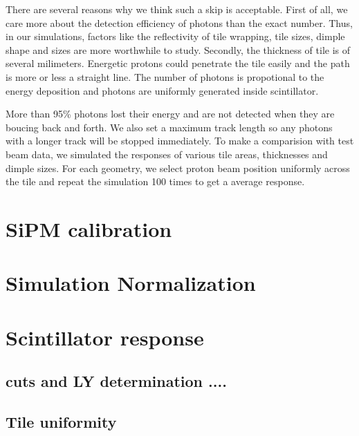 \documentclass[a4paper,11pt]{article}
\begin{document}
There are several reasons why we think such a skip is acceptable. 
First of all, we care more about the detection efficiency of photons than the exact number. 
Thus, in our simulations, factors like the reflectivity of tile wrapping, tile sizes, dimple shape and sizes are more worthwhile to study.
Secondly, the thickness of tile is of several milimeters. 
Energetic protons could penetrate the tile easily and the path is more or less a straight line.
The number of photons is propotional to the energy deposition and photons are uniformly generated inside scintillator. 

More than 95\% photons lost their energy  and are not detected when they are boucing back and forth. 
We also set a maximum track length so any photons with a longer track will be stopped immediately.
To make a comparision with test beam data, we simulated the responses of various tile areas, thicknesses and dimple sizes. 
For each geometry, we select proton beam position uniformly across the tile and repeat the simulation 100 times to get a average response. 









\section{SiPM calibration}
\label{sec:calibration}

\section{Simulation Normalization}

\section{Scintillator response}
\subsection{cuts and LY determination ....}
\subsection{Tile uniformity}
\end{document}
